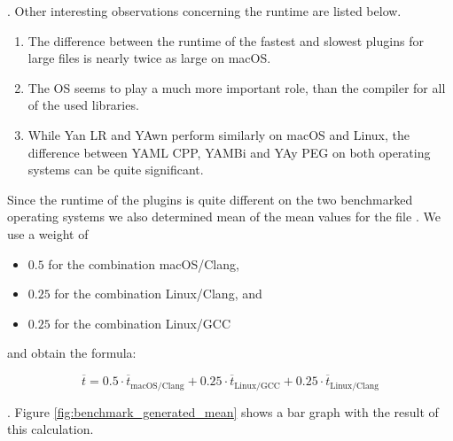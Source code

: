 . Other interesting observations concerning the runtime are listed below.

\begin{enumerate}
  \item The difference between the runtime of the fastest and slowest plugins for large files is nearly twice as large on macOS.

  \item The OS seems to play a much more important role, than the compiler for all of the used  libraries.

  \item While Yan LR and YAwn perform similarly on macOS and Linux, the difference between YAML CPP, YAMBi and YAy PEG on both operating systems can be quite significant.
\end{enumerate}

Since the runtime of the plugins is quite different on the two benchmarked operating systems we also determined mean of the mean values for the file \FileGenerated{}. We use a weight of

\begin{itemize}
  \item $0.5$ for the combination macOS/Clang,
  \item $0.25$ for the combination Linux/Clang, and
  \item $0.25$ for the combination Linux/GCC
\end{itemize}

and obtain the formula:

\begin{equation}
  \overline{t} = 0.5  · \overline{t}_{\text{macOS/Clang}} +
                 0.25 · \overline{t}_{\text{Linux/GCC}} +
                 0.25 · \overline{t}_{\text{Linux/Clang}}
  \label{eq:benchmark_generated_mean}
\end{equation}

. Figure \ref{fig:benchmark_generated_mean} shows a bar graph with the result of this calculation.

